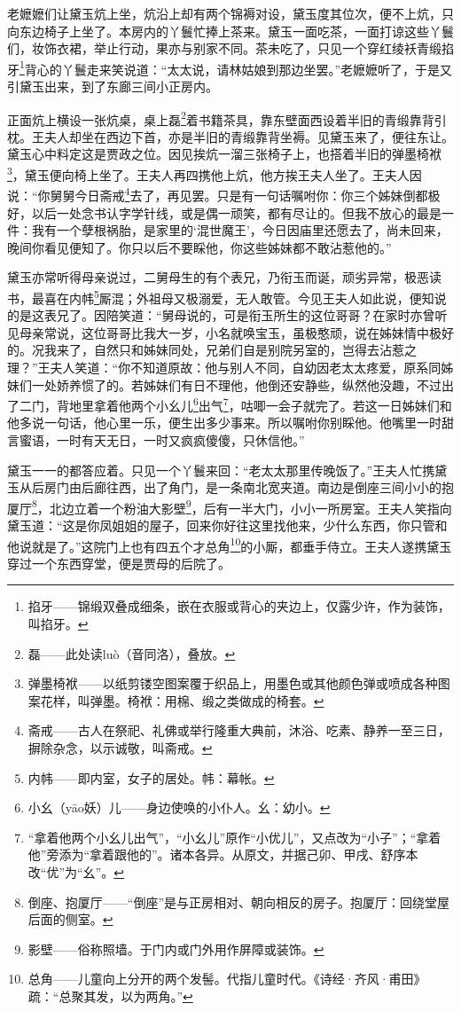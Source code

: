 \par 老嬷嬷们让黛玉炕上坐，炕沿上却有两个锦褥对设，黛玉度其位次，便不上炕，只向东边椅子上坐了。本房内的丫鬟忙捧上茶来。黛玉一面吃茶，一面打谅这些丫鬟们，妆饰衣裙，举止行动，果亦与别家不同。茶未吃了，只见一个穿红绫袄青缎掐牙\footnote{掐牙——锦缎双叠成细条，嵌在衣服或背心的夹边上，仅露少许，作为装饰，叫掐牙。}背心的丫鬟走来笑说道：“太太说，请林姑娘到那边坐罢。”老嬷嬷听了，于是又引黛玉出来，到了东廊三间小正房内。
\par 正面炕上横设一张炕桌，桌上磊\footnote{磊——此处读luò（音同洛），叠放。}着书籍茶具，靠东壁面西设着半旧的青缎靠背引枕。王夫人却坐在西边下首，亦是半旧的青缎靠背坐褥。见黛玉来了，便往东让。黛玉心中料定这是贾政之位。因见挨炕一溜三张椅子上，也搭着半旧的弹墨椅袱\footnote{弹墨椅袱——以纸剪镂空图案覆于织品上，用墨色或其他颜色弹或喷成各种图案花样，叫弹墨。椅袱：用棉、缎之类做成的椅套。}，黛玉便向椅上坐了。王夫人再四携他上炕，他方挨王夫人坐了。王夫人因说：“你舅舅今日斋戒\footnote{斋戒——古人在祭祀、礼佛或举行隆重大典前，沐浴、吃素、静养一至三日，摒除杂念，以示诚敬，叫斋戒。}去了，再见罢。只是有一句话嘱咐你：你三个姊妹倒都极好，以后一处念书认字学针线，或是偶一顽笑，都有尽让的。但我不放心的最是一件：我有一个孽根祸胎，是家里的‘混世魔王’，今日因庙里还愿去了，尚未回来，晚间你看见便知了。你只以后不要睬他，你这些姊妹都不敢沾惹他的。”
\par 黛玉亦常听得母亲说过，二舅母生的有个表兄，乃衔玉而诞，顽劣异常，极恶读书，最喜在内帏\footnote{内帏——即内室，女子的居处。帏：幕帐。}厮混；外祖母又极溺爱，无人敢管。今见王夫人如此说，便知说的是这表兄了。因陪笑道：“舅母说的，可是衔玉所生的这位哥哥？在家时亦曾听见母亲常说，这位哥哥比我大一岁，小名就唤宝玉，虽极憨顽，说在姊妹情中极好的。况我来了，自然只和姊妹同处，兄弟们自是别院另室的，岂得去沾惹之理？”王夫人笑道：“你不知道原故：他与别人不同，自幼因老太太疼爱，原系同姊妹们一处娇养惯了的。若姊妹们有日不理他，他倒还安静些，纵然他没趣，不过出了二门，背地里拿着他两个小幺儿\footnote{小幺（yāo妖）儿——身边使唤的小仆人。幺：幼小。}出气\footnote{“拿着他两个小幺儿出气”，“小幺儿”原作“小优儿”，又点改为“小子”；“拿着他”旁添为“拿着跟他的”。诸本各异。从原文，并据己卯、甲戌、舒序本改“优”为“幺”。}，咕唧一会子就完了。若这一日姊妹们和他多说一句话，他心里一乐，便生出多少事来。所以嘱咐你别睬他。他嘴里一时甜言蜜语，一时有天无日，一时又疯疯傻傻，只休信他。”
\par 黛玉一一的都答应着。只见一个丫鬟来回：“老太太那里传晚饭了。”王夫人忙携黛玉从后房门由后廊往西，出了角门，是一条南北宽夹道。南边是倒座三间小小的抱厦厅\footnote{倒座、抱厦厅——“倒座”是与正房相对、朝向相反的房子。抱厦厅：回绕堂屋后面的侧室。}，北边立着一个粉油大影壁\footnote{影壁——俗称照墙。于门内或门外用作屏障或装饰。}，后有一半大门，小小一所房室。王夫人笑指向黛玉道：“这是你凤姐姐的屋子，回来你好往这里找他来，少什么东西，你只管和他说就是了。”这院门上也有四五个才总角\footnote{总角——儿童向上分开的两个发髻。代指儿童时代。《诗经·齐风·甫田》疏：“总聚其发，以为两角。”}的小厮，都垂手侍立。王夫人遂携黛玉穿过一个东西穿堂，便是贾母的后院了。
